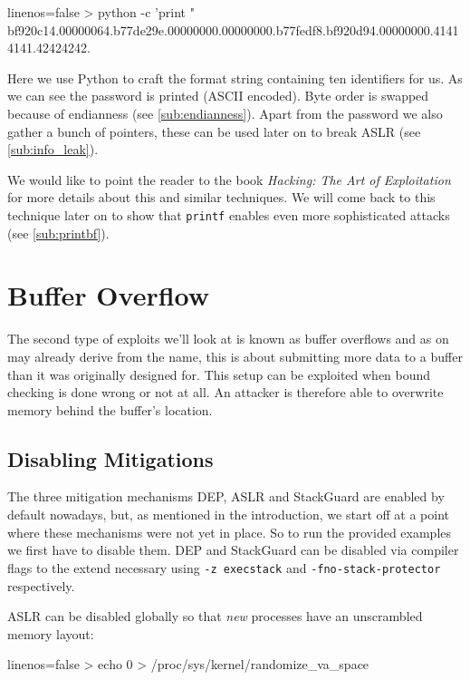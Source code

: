 \documentclass[article]{uibk}
\begin{document}
\begin{code*}{linenos=false}
    > python -c 'print "%
    bf920c14.00000064.b77de29e.00000000.00000000.b77fedf8.bf920d94.00000000.41414141.42424242.
\end{code*}

Here we use Python to craft the format string containing ten identifiers for
us. As we can see the password is printed (ASCII encoded). Byte order is
swapped because of endianness (see \cref{sub:endianness}). Apart from the
password we also gather a bunch of pointers, these can be used later on to
break ASLR (see \cref{sub:info_leak}).

We would like to point the reader to the book \textit{Hacking: The Art of
Exploitation}~\cite[pp.~167]{art_of_exploitation} for more details about this
and similar techniques. We will come back to this technique later on to show
that \texttt{printf} enables even more sophisticated attacks (see
\cref{sub:printbf}).

\section{Buffer Overflow}
\label{sec:buffer_overflow}

The second type of exploits we'll look at is known as buffer overflows and as
on may already derive from the name, this is about submitting more data to a
buffer than it was originally designed for. This setup can be exploited when
bound checking is done wrong or not at all. An attacker is therefore able to
overwrite memory behind the buffer's location.

\subsection{Disabling Mitigations}

The three mitigation mechanisms DEP, ASLR and StackGuard are enabled by default
nowadays, but, as mentioned in the introduction, we start off at a point where
these mechanisms were not yet in place. So to run the provided examples we
first have to disable them. DEP and StackGuard can be disabled via compiler
flags to the extend necessary using \texttt{-z execstack} and
\texttt{-fno-stack-protector} respectively.

ASLR can be disabled globally so that \emph{new} processes have an unscrambled
memory layout:

\begin{code*}{linenos=false}
    > echo 0 > /proc/sys/kernel/randomize_va_space
\end{code*}
\end{document}
